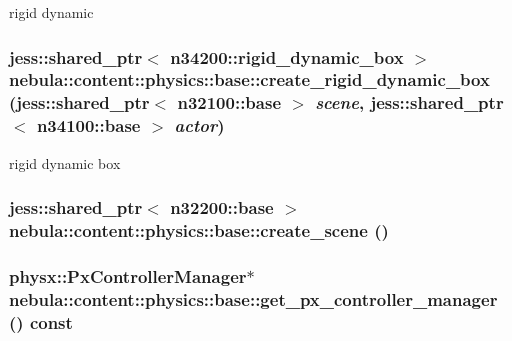 rigid dynamic \hypertarget{classnebula_1_1content_1_1physics_1_1base_ab0f705269191e10cdde2f83b7c96413b}{
\subsubsection[{create\_\-rigid\_\-dynamic\_\-box}]{\setlength{\rightskip}{0pt plus 5cm}jess::shared\_\-ptr$<$ {\bf n34200::rigid\_\-dynamic\_\-box} $>$ nebula::content::physics::base::create\_\-rigid\_\-dynamic\_\-box (jess::shared\_\-ptr$<$ {\bf n32100::base} $>$ {\em scene}, \/  jess::shared\_\-ptr$<$ {\bf n34100::base} $>$ {\em actor})}}
\label{classnebula_1_1content_1_1physics_1_1base_ab0f705269191e10cdde2f83b7c96413b}


rigid dynamic box \hypertarget{classnebula_1_1content_1_1physics_1_1base_a270629bb6c29e5d3121059ed434fbfaf}{
\subsubsection[{create\_\-scene}]{\setlength{\rightskip}{0pt plus 5cm}jess::shared\_\-ptr$<$ {\bf n32200::base} $>$ nebula::content::physics::base::create\_\-scene ()}}
\label{classnebula_1_1content_1_1physics_1_1base_a270629bb6c29e5d3121059ed434fbfaf}
\hypertarget{classnebula_1_1content_1_1physics_1_1base_a57ac03fda506751b4062aa75bb6dc33f}{
\subsubsection[{get\_\-px\_\-controller\_\-manager}]{\setlength{\rightskip}{0pt plus 5cm}physx::PxControllerManager$\ast$ nebula::content::physics::base::get\_\-px\_\-controller\_\-manager () const}}
\label{classnebula_1_1content_1_1physics_1_1base_a57ac03fda506751b4062aa75bb6dc33f}


